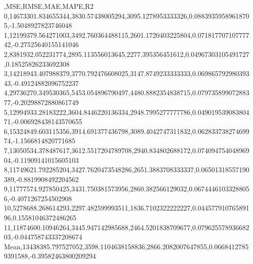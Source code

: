 ,MSE,RMSE,MAE,MAPE,R2
0,14673301.834655344,3830.57438005294,3095.1278953333326,0.08839359589618705,-1.5048927823746048
1,12199379.564271003,3492.760364488115,2601.1720403225804,0.07181770710777742,-0.27525640155141046
2,8381932.052231774,2895.113556013645,2277.395356451612,0.04967303105491727,0.18525826233692308
3,14218943.407988379,3770.792476608025,3147.8749233333333,0.06986579298039343,-0.49124882096752237
4,29736270.349530365,5453.054896790497,4480.8882354838715,0.07973589907288377,-0.20298872880861749
5,12994933.28183222,3604.8446220136334,2948.7995277777786,0.04901953908380471,-0.006928438143570655
6,15324849.603115356,3914.691377436798,3089.4042747311832,0.06283373827469974,-1.1566814820771685
7,13050534.378487617,3612.5517204789708,2940.834802688172,0.07409475404896904,-0.11909141015605103
8,11749621.792285204,3427.7620473548286,2651.3883708333337,0.06501318557190389,-0.8819908492204562
9,11777574.927850425,3431.750381573956,2860.382566129032,0.06744461033288056,-0.4071267254502908
10,5278688.268614293,2297.482599993511,1836.7102322222227,0.04457791076589196,0.15581046372486265
11,11874600.10946264,3445.947142985688,2464.5201838709677,0.07962557893668203,-0.044758743337208674
Mean,13438385.797527052,3598.1104638158836,2866.2082007647855,0.06684127859391588,-0.39582463800209294
